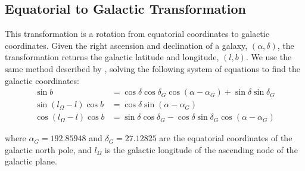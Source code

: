 \documentclass[iop,apj]{emulateapj}
\begin{document}
\subsection{Equatorial to Galactic Transformation}
\label{sec:eq_to_gal}
\par This transformation is a rotation from equatorial coordinates to galactic coordinates. Given the right ascension and declination of a galaxy, $(\alpha,\delta)$, the transformation returns the galactic latitude and longitude, $(l,b)$. We use the same method described by \cite{poleski2013}, solving the following system of equations to find the galactic coordinates:
\begin{equation}
\begin{aligned}
\sin b &= \cos\delta\cos\delta_{G}\cos(\alpha - \alpha_{G}) + \sin\delta\sin\delta_{G} \\
\sin(l_{\Omega} - l)\cos b &= \cos\delta\sin(\alpha - \alpha_{G}) \\
\cos(l_{\Omega} - l)\cos b &= \sin\delta\cos\delta_{G} - \cos\delta\sin\delta_{G}\cos(\alpha - \alpha_{G})
\end{aligned}
\end{equation}

where $\alpha_{G} = 192.85948$ and $\delta_{G} = 27.12825$ are the equatorial coordinates of the galactic north pole, and $l_{\Omega}$ is the galactic longitude of the ascending node of the galactic plane.
\end{document}
